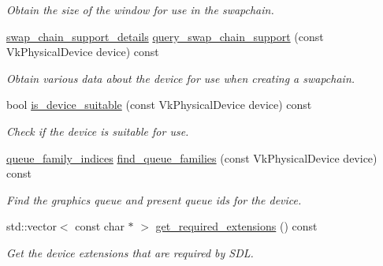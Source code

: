 \begin{DoxyCompactItemize}
\begin{DoxyCompactList}\small\item\em Obtain the size of the window for use in the swapchain. \end{DoxyCompactList}\item 
\mbox{\hyperlink{structswap__chain__support__details}{swap\+\_\+chain\+\_\+support\+\_\+details}} \mbox{\hyperlink{classvulkan__application_a3f801985d5df0d3e377e5356980f5fa2}{query\+\_\+swap\+\_\+chain\+\_\+support}} (const Vk\+Physical\+Device device) const
\begin{DoxyCompactList}\small\item\em Obtain various data about the device for use when creating a swapchain. \end{DoxyCompactList}\item 
bool \mbox{\hyperlink{classvulkan__application_ae329db3c0937c649fa95b64250372a43}{is\+\_\+device\+\_\+suitable}} (const Vk\+Physical\+Device device) const
\begin{DoxyCompactList}\small\item\em Check if the device is suitable for use. \end{DoxyCompactList}\item 
\mbox{\hyperlink{structqueue__family__indices}{queue\+\_\+family\+\_\+indices}} \mbox{\hyperlink{classvulkan__application_abbba891d35788327d9fa1b28c90fbd0e}{find\+\_\+queue\+\_\+families}} (const Vk\+Physical\+Device device) const
\begin{DoxyCompactList}\small\item\em Find the graphics queue and present queue id\textquotesingle{}s for the device. \end{DoxyCompactList}\item 
std\+::vector$<$ const char $\ast$ $>$ \mbox{\hyperlink{classvulkan__application_ac11d2776b4aceb5c69b397bd474c5955}{get\+\_\+required\+\_\+extensions}} () const
\begin{DoxyCompactList}\small\item\em Get the device extensions that are required by S\+DL. \end{DoxyCompactList}\end{DoxyCompactItemize}

